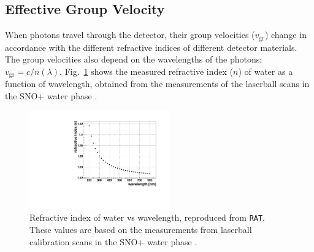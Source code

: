 \subsection{Effective Group Velocity}\label{sect:tuneGroupVelocity}

When photons travel through the detector, their group velocities ($v_\mathrm{gr}$) change in accordance with the different refractive indices of different detector materials. The group velocities also depend on the wavelengths of the photons: $v_\mathrm{gr}=c/n(\lambda)$. Fig.~\ref{nVsWavelength} shows the measured refractive index ($n$) of water as a function of wavelength, obtained from the measurements of the laserball scans in the SNO+ water phase \cite{laserball_groupVelocity}. %

\begin{figure}[!htb]
	\centering
	\includegraphics[width=6cm]{refractiveIndexVsWavelength.pdf}
	\caption[Refractive index of water vs wavelength.]{Refractive index of water vs wavelength, reproduced from \texttt{RAT}. These values are based on the measurements from laserball calibration scans in the SNO+ water phase \cite{laserball_groupVelocity}.	\label{nVsWavelength}}
\end{figure}

